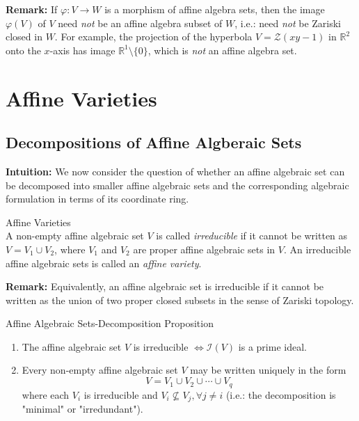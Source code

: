 \noindent\textbf{Remark:} If $\varphi:V \to W$ is a morphism of affine algebra sets, then the image $\varphi(V)$ of $V$ need \textit{not} be an affine algebra subset of $W$, i.e.: need \textit{not} be Zariski closed in $W$. For example, the projection of the hyperbola $V= \mathcal{Z} (xy-1)$ in $\mathbb{R}^2$ onto the $x$-axis has image $\mathbb{R}^1 \setminus \{0\}$, which is \textit{not} an affine algebra set.

\section{Affine Varieties}

\subsection{Decompositions of Affine Algberaic Sets}

\noindent\textbf{Intuition:} We now consider the question of whether an affine algebraic set can be decomposed into smaller affine algebraic sets and the corresponding algebraic formulation in terms of its coordinate ring.

\begin{definition}{Affine Varieties}\\
A non-empty affine algebraic set $V$ is called \textit{irreducible} if it cannot be written as $V= V_1 \cup V_2$, where $V_1$ and $V_2$ are proper affine algebraic sets in $V$. An irreducible affine algebraic sets is called an \textit{affine variety}.
\end{definition}

\noindent\textbf{Remark:} Equivalently, an affine algebraic set is irreducible if it cannot be written as the union of two proper closed subsets in the sense of Zariski topology.

\begin{proposition}{Affine Algebraic Sets-Decomposition Proposition}\\
\begin{enumerate}
    \item The affine algebraic set $V$ is irreducible $\Leftrightarrow \mathcal{I}(V)$ is a prime ideal.
    \item Every non-empty affine algebraic set $V$ may be written uniquely in the form
    $$V= V_1 \cup V_2 \cup \cdots \cup V_q$$
    where each $V_i$ is irreducible and $V_i \not\subseteq V_j, \forall j\neq i$ (i.e.: the decomposition is "minimal" or "irredundant").
\end{enumerate}
\end{proposition}

